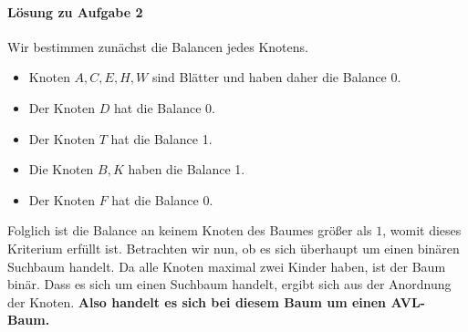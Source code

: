 \documentclass[11pt,a4paper]{scrartcl}
\begin{document}
\paragraph{Lösung zu Aufgabe 2}
\label{a4.2:lsg}
Wir bestimmen zunächst die Balancen jedes Knotens.
\begin{itemize}
\item Knoten $A, C, E, H, W$ sind Blätter und haben daher die Balance 0.
\item Der Knoten $D$ hat die Balance 0.
\item Der Knoten $T$ hat die Balance 1.
\item Die Knoten $B, K$ haben die Balance 1.
\item Der Knoten $F$ hat die Balance 0.
\end{itemize}
Folglich ist die Balance an keinem Knoten des Baumes größer als $1$, womit dieses Kriterium erfüllt ist. Betrachten wir nun, ob es sich überhaupt um einen binären Suchbaum handelt. Da alle Knoten maximal zwei Kinder haben, ist der Baum binär. Dass es sich um einen Suchbaum handelt, ergibt sich aus der Anordnung der Knoten. \textbf{Also handelt es sich bei diesem Baum um einen AVL-Baum.}
\end{document}

